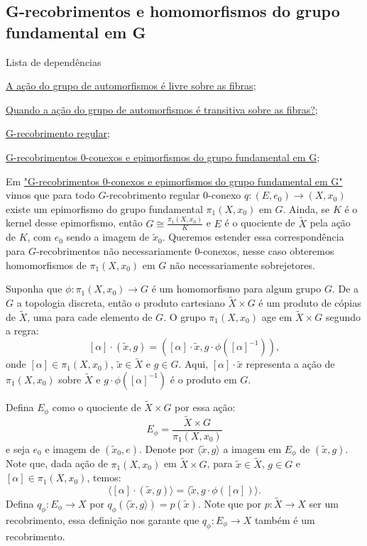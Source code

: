 \subsection{G-recobrimentos e homomorfismos do grupo fundamental em G}
\label{homomorfismos-e-g-recobrimentos-prop}
\begin{titlemize}{Lista de dependências}
    \item \hyperref[acao-de-automorfismos-e-livre-prop]{A ação do grupo de automorfismos é livre sobre as fibras};\\
    \item \hyperref[acao-de-automorfismo-transitiva-prop]{Quando a ação do grupo de automorfismos é transitiva sobre as fibras?};\\
    \item \hyperref[g-recobrimento-regular-def]{G-recobrimento regular};\\
	\item \hyperref[g-recobrimentos-e-epimorfismos-prop]{G-recobrimentos 0-conexos e epimorfismos do grupo fundamental em G};
\end{titlemize}

Em \hyperref[g-recobrimentos-e-epimorfismos-prop]{"G-recobrimentos 0-conexos e epimorfismos do grupo fundamental em G"} vimos que para todo $G$-recobrimento regular $0$-conexo $q:(E, e_0) \longrightarrow (X, x_0)$ existe um epimorfismo do grupo fundamental $\pi_1(X, x_0)$ em $G$. Ainda, se $K$ é o kernel desse epimorfismo, então $G \cong \frac{\pi_1(X, x_0)}{K}$ e $E$ é o quociente de $\tilde X$ pela ação de $K$, com $e_0$ sendo a imagem de $\tilde x_0$. Queremos estender essa correspondência para $G$-recobrimentos não necessariamente $0$-conexos, nesse caso obteremos homomorfismos de $\pi_1(X, x_0)$ em $G$ não necessariamente sobrejetores.

Suponha que $\phi: \pi_1(X, x_0) \longrightarrow G$ é um homomorfismo para algum grupo $G$. De a $G$ a topologia discreta, então o produto cartesiano $\tilde X \times G$ é um produto de cópias de $\tilde X$, uma para cade elemento de $G$. O grupo $\pi_1(X, x_0)$ age em $\tilde X \times G$ segundo a regra: $$[\alpha] \cdot (\tilde x, g) = ([\alpha] \cdot \tilde x, g \cdot \phi([\alpha]^{-1})),$$ onde $[\alpha] \in \pi_1(X, x_0)$, $\tilde x \in \tilde X$ e $g \in G$. Aqui, $[\alpha] \cdot \tilde x$ representa a ação de $\pi_1(X, x_0)$ sobre $\tilde X$ e $g \cdot \phi([\alpha]^{-1})$ é o produto em $G$.

Defina $E_{\phi}$ como o quociente de $\tilde X \times G$ por essa ação: $$E_{\phi} = \frac{\tilde X \times G}{\pi_1(X, x_0)}$$ e seja $e_0$ e imagem de $(\tilde x_0, e)$. Denote por $\langle \tilde x, g \rangle$ a imagem em $E_{\phi}$ de $(\tilde x, g)$. Note que, dada ação de $\pi_1(X, x_0)$ em $\tilde X \times G$, para $\tilde x \in \tilde X$, $g \in G$ e $[\alpha] \in \pi_1(X, x_0)$, temos: $$\langle [\alpha] \cdot (\tilde x, g) \rangle = \langle \tilde x, g \cdot \phi([\alpha]) \rangle.$$ Defina $q_{\phi}: E_{\phi} \longrightarrow X$ por $q_{\phi}(\langle \tilde x, g \rangle) = p(\tilde x)$. Note que por $p: \tilde X \longrightarrow X$ ser um recobrimento, essa definição nos garante que $q_{\phi}:E_{\phi} \longrightarrow X$ também é um recobrimento.

